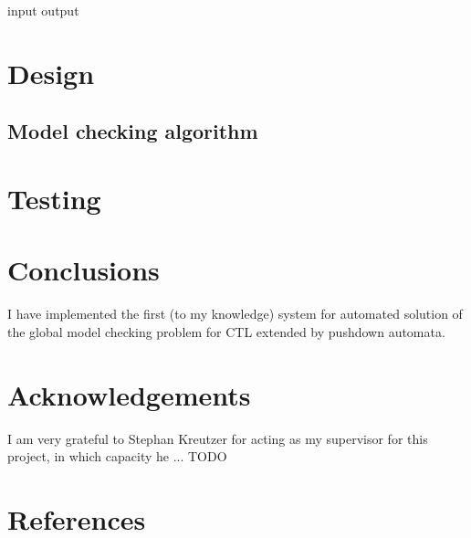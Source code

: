 \documentclass[11pt]{article}
\begin{document}
input
output



\section{Design}


\subsection{Model checking algorithm}


\cite{EHRS00b}

\section{Testing}

\section{Conclusions}

I have implemented the first (to my knowledge) system for automated solution of
the global model checking problem for CTL extended by pushdown automata.

\section{Acknowledgements}

I am very grateful to Stephan Kreutzer for acting as my supervisor for this project, in which capacity he ... TODO


\section{References}
{}

\end{document}

